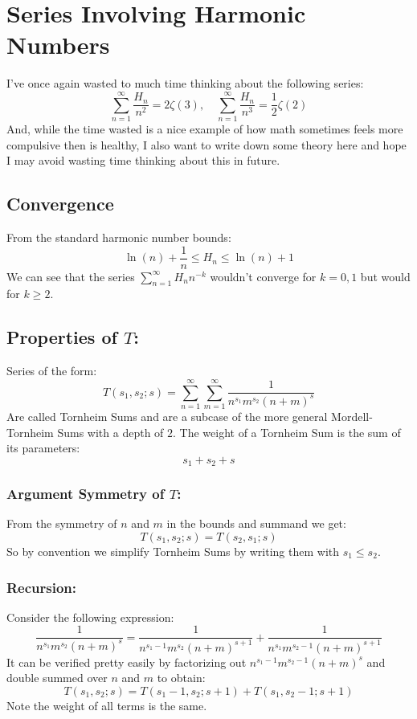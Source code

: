 
\section{Series Involving Harmonic Numbers}
I've once again wasted to much time thinking about the following series:
\[\sum_{n=1}^\infty\frac{H_n}{n^2}=2\zeta(3),\quad \sum_{n=1}^\infty\frac{H_n}{n^3}=\frac{1}{2}\zeta(2)\]
And,
while the time wasted is a nice example of how math sometimes feels more compulsive then is healthy,
I also want to write down some theory here and hope I may avoid wasting time thinking about this in future.

\subsection{Convergence}
From the standard harmonic number bounds:
\[\ln(n)+\frac{1}{n} \leq H_n \leq \ln(n)+1\]
We can see that the series $\sum_{n=1}^\infty H_nn^{-k}$ wouldn't converge for $k=0,1$ but would for $k\geq 2$.

\subsection{Properties of $T$:}
Series of the form:
\[T(s_1,s_2;s) = \sum_{n=1}^{\infty}\sum_{m=1}^{\infty}\frac{1}{n^{s_1}m^{s_2}(n+m)^s}\]
Are called Tornheim Sums and are a subcase of the more general Mordell-Tornheim Sums with a depth of $2$.
The weight of a Tornheim Sum is the sum of its parameters:
\[s_1+s_2+s\]

\subsubsection{Argument Symmetry of $T$:}
From the symmetry of $n$ and $m$ in the bounds and summand we get:
\[T(s_1,s_2;s) = T(s_2,s_1;s)\]
So by convention we simplify Tornheim Sums by writing them with $s_1\leq s_2$.

\subsubsection{Recursion:}
Consider the following expression:
\[\frac{1}{n^{s_1}m^{s_2}(n+m)^s} = \frac{1}{n^{s_1-1}m^{s_2}(n+m)^{s+1}}+\frac{1}{n^{s_1}m^{s_2-1}(n+m)^{s+1}}\]
It can be verified pretty easily by factorizing out $n^{s_1-1}m^{s_2-1}(n+m)^s$ and
double summed  over $n$ and $m$ to obtain:
\[T(s_1,s_2;s) = T(s_1-1,s_2;s+1)+T(s_1,s_2-1;s+1)\]
Note the weight of all terms is the same.

